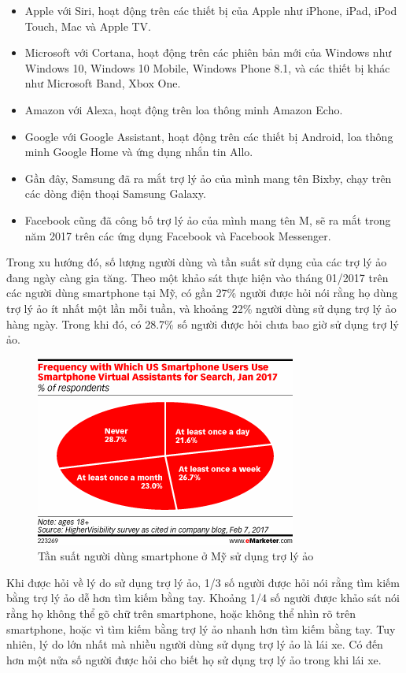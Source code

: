 \begin{itemize}
    \item Apple với Siri, hoạt động trên các thiết bị của Apple như iPhone, iPad, iPod Touch, Mac và Apple TV.
    \item Microsoft với Cortana, hoạt động trên các phiên bản mới của Windows như Windows 10, Windows 10 Mobile, Windows Phone 8.1, và các thiết bị khác như Microsoft Band, Xbox One.
    \item Amazon với Alexa, hoạt động trên loa thông minh Amazon Echo.
    \item Google với Google Assistant, hoạt động trên các thiết bị Android, loa thông minh Google Home và ứng dụng nhắn tin Allo.
    \item Gần đây, Samsung đã ra mắt trợ lý ảo của mình mang tên Bixby, chạy trên các dòng điện thoại Samsung Galaxy.
    \item Facebook cũng đã công bố trợ lý ảo của mình mang tên M, sẽ ra mắt trong năm 2017 trên các ứng dụng Facebook và Facebook Messenger.
\end{itemize}

Trong xu hướng đó, số lượng người dùng và tần suất sử dụng của các trợ lý ảo đang ngày càng gia tăng. Theo một khảo sát thực hiện vào tháng 01/2017 trên các người dùng smartphone tại Mỹ\cite{emarketerreport}, có gần 27\% người được hỏi nói rằng họ dùng trợ lý ảo ít nhất một lần mỗi tuần, và khoảng 22\% người dùng sử dụng trợ lý ảo hàng ngày. Trong khi đó, có 28.7\% số người được hỏi chưa bao giờ sử dụng trợ lý ảo.

\begin{figure}[h]
    \centering
    \includegraphics[scale=1]{emarketer_1}
    \caption{Tần suất người dùng smartphone ở Mỹ sử dụng trợ lý ảo\cite{emarketerreport}}
    \label{fig:c1_emarketer_1}
\end{figure}

Khi được hỏi về lý do sử dụng trợ lý ảo, 1/3 số người được hỏi nói rằng tìm kiếm bằng trợ lý ảo dễ hơn tìm kiếm bằng tay. Khoảng 1/4 số người được khảo sát nói rằng họ không thể gõ chữ trên smartphone, hoặc không thể nhìn rõ trên smartphone, hoặc vì tìm kiếm bằng trợ lý ảo nhanh hơn tìm kiếm bằng tay. Tuy nhiên, lý do lớn nhất mà nhiều người dùng sử dụng trợ lý ảo là lái xe. Có đến hơn một nửa số người được hỏi cho biết họ sử dụng trợ lý ảo trong khi lái xe.

